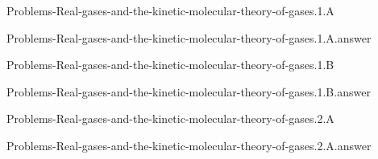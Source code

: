 \documentclass[main.tex]{subfiles}
\newcommand\chapterlabel{}
\begin{document}
\renewcommand\chapterlabel{Ch-Gas}
\begin{question}[ID=\the\value{numA}]
{Problems-Real-gases-and-the-kinetic-molecular-theory-of-gases.1.A}
\end{question}
   \begin{Form}
   \TextField[multiline,backgroundcolor=gray!20,borderwidth=0,width=0.43\textwidth  ,height=115pt, name=\the\value{numA}]  { }\end{Form}
\begin{solution}
{Problems-Real-gases-and-the-kinetic-molecular-theory-of-gases.1.A.answer}
\hspace{0.1cm}
\end{solution}


\renewcommand\chapterlabel{Ch-Gas}
\begin{question}[ID=\the\value{numA}]
{Problems-Real-gases-and-the-kinetic-molecular-theory-of-gases.1.B}
\end{question}
   \begin{Form}
   \TextField[multiline,backgroundcolor=gray!20,borderwidth=0,width=0.43\textwidth  ,height=115pt, name=\the\value{numA}]  { }\end{Form}
\begin{solution}
{Problems-Real-gases-and-the-kinetic-molecular-theory-of-gases.1.B.answer}
\hspace{0.1cm}
\end{solution}


\renewcommand\chapterlabel{Ch-Gas}
\begin{question}[ID=\the\value{numA}]
{Problems-Real-gases-and-the-kinetic-molecular-theory-of-gases.2.A}
\end{question}
   \begin{Form}
   \TextField[multiline,backgroundcolor=gray!20,borderwidth=0,width=0.43\textwidth  ,height=115pt, name=\the\value{numA}]  { }\end{Form}
\begin{solution}
{Problems-Real-gases-and-the-kinetic-molecular-theory-of-gases.2.A.answer}
\hspace{0.1cm}
\end{solution}
\end{document}

